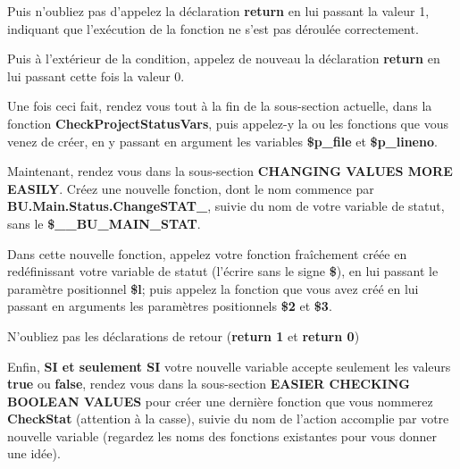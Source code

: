 \documentclass[a4paper,10pt]{article}
\begin{document}
    \begin{justify}
        Puis n'oubliez pas d'appelez la déclaration \textbf{\color{cmds}return} en lui passant la valeur 1, indiquant que l'exécution de la fonction ne s'est pas déroulée correctement.
    \end{justify}

    \begin{justify}
        Puis à l'extérieur de la condition, appelez de nouveau la déclaration \textbf{\color{cmds}return} en lui passant cette fois la valeur 0.
    \end{justify}

    \begin{justify}
        Une fois ceci fait, rendez vous tout à la fin de la sous-section actuelle, dans la fonction \textbf{\color{mauve}CheckProjectStatusVars}, puis appelez-y la ou les fonctions que vous venez de créer, en y passant en argument les variables \textbf{\color{vars}\$p\_file} et \textbf{\color{vars}\$p\_lineno}.\\\mbox{}
    \end{justify}


    \begin{justify}
        Maintenant, rendez vous dans la sous-section \textbf{CHANGING VALUES MORE EASILY}. Créez une nouvelle fonction, dont le nom commence par \textbf{\color{mauve}BU.Main.Status.ChangeSTAT\_}, suivie du nom de votre variable de statut, sans le \textbf{\color{vars}\$\_\_BU\_MAIN\_STAT}.
    \end{justify}

    \begin{justify}
        Dans cette nouvelle fonction, appelez votre fonction fraîchement créée en redéfinissant votre variable de statut (l'écrire sans le signe \textbf{\$}), en lui passant le paramètre positionnel \textbf{\$l}; puis appelez la fonction que vous avez créé en lui passant en arguments les paramètres positionnels \textbf{\$2} et \textbf{\$3}.
    \end{justify}

    \begin{justify}
        N'oubliez pas les déclarations de retour (\textbf{\color{cmds}return 1} et \textbf{\color{cmds}return 0})\\\mbox{}
    \end{justify}


    \begin{justify}
        Enfin, \textbf{SI et seulement SI} votre nouvelle variable accepte seulement les valeurs \textbf{true} ou \textbf{false}, rendez vous dans la sous-section \textbf{EASIER CHECKING BOOLEAN VALUES} pour créer une dernière fonction que vous nommerez \textbf{\color{mauve}CheckStat} (attention à la casse), suivie du nom de l'action accomplie par votre nouvelle variable (regardez les noms des fonctions existantes pour vous donner une idée).
    \end{justify}
\end{document}
